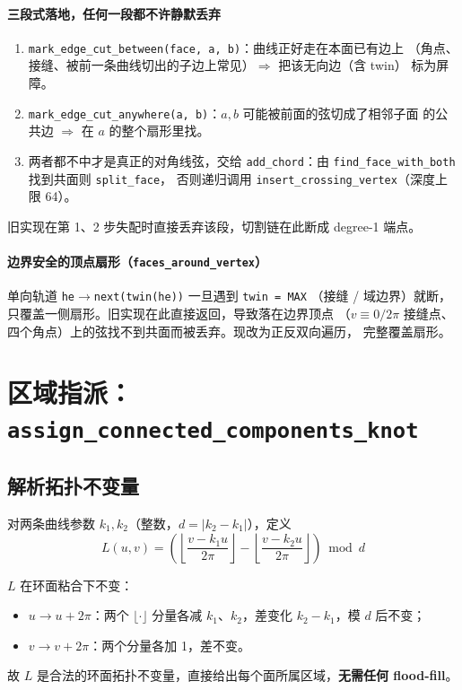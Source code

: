 \documentclass{article}
\begin{document}
\paragraph{三段式落地，任何一段都不许静默丢弃}
\begin{enumerate}
\item \texttt{mark\_edge\_cut\_between(face, a, b)}：曲线正好走在本面已有边上
  （角点、接缝、被前一条曲线切出的子边上常见）$\Rightarrow$ 把该无向边（含 twin）
  标为屏障。
\item \texttt{mark\_edge\_cut\_anywhere(a, b)}：$a,b$ 可能被前面的弦切成了相邻子面
  的公共边 $\Rightarrow$ 在 $a$ 的整个扇形里找。
\item 两者都不中才是真正的对角线弦，交给 \texttt{add\_chord}：由
  \texttt{find\_face\_with\_both} 找到共面则 \texttt{split\_face}，
  否则递归调用 \texttt{insert\_crossing\_vertex}（深度上限 64）。
\end{enumerate}
旧实现在第 1、2 步失配时直接丢弃该段，切割链在此断成 degree-1 端点。

\paragraph{边界安全的顶点扇形（\texttt{faces\_around\_vertex}）}
单向轨道 \texttt{he}$\to$\texttt{next(twin(he))} 一旦遇到 \texttt{twin = MAX}
（接缝 / 域边界）就断，只覆盖一侧扇形。旧实现在此直接返回，导致落在边界顶点
（$v\equiv0/2\pi$ 接缝点、四个角点）上的弦找不到共面而被丢弃。现改为正反双向遍历，
完整覆盖扇形。

\section{区域指派：\texttt{assign\_connected\_components\_knot}}
\label{sec:whyformula}

\subsection*{解析拓扑不变量}

对两条曲线参数 $k_1,k_2$（整数，$d=|k_2-k_1|$），定义
\[
\boxed{\;
L(u,v) = \left(\left\lfloor \frac{v-k_1 u}{2\pi} \right\rfloor
              -\left\lfloor \frac{v-k_2 u}{2\pi} \right\rfloor \right) \bmod d
\;}
\]

$L$ 在环面粘合下不变：
\begin{itemize}
\item $u\to u+2\pi$：两个 $\lfloor\cdot\rfloor$ 分量各减 $k_1$、$k_2$，差变化 $k_2-k_1$，模 $d$ 后不变；
\item $v\to v+2\pi$：两个分量各加 1，差不变。
\end{itemize}
故 $L$ 是合法的环面拓扑不变量，直接给出每个面所属区域，\textbf{无需任何 flood-fill}。
\end{document}
